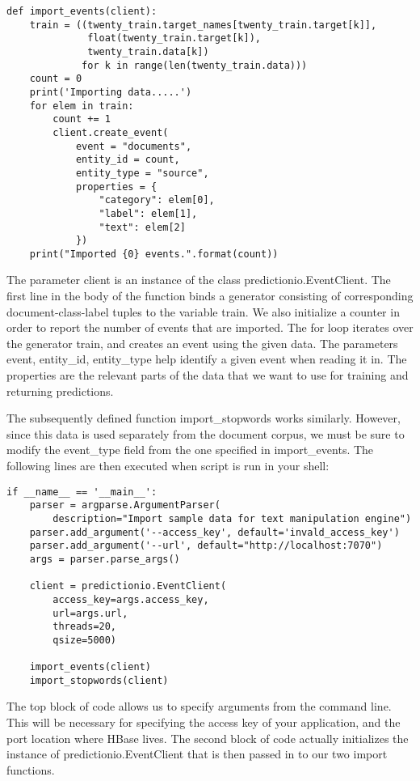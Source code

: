 \documentclass[a4paper,12pt]{article}
\newcommand{\3}{\left}
\newcommand{\4}{\right}
\renewcommand{\-}[1]{{}^{-#1}}
\begin{document}
\begin{verbatim}
def import_events(client):
    train = ((twenty_train.target_names[twenty_train.target[k]],
              float(twenty_train.target[k]),
              twenty_train.data[k]) 
             for k in range(len(twenty_train.data)))
    count = 0
    print('Importing data.....')
    for elem in train:
        count += 1
        client.create_event(
            event = "documents",
            entity_id = count,
            entity_type = "source",
            properties = {
                "category": elem[0],
                "label": elem[1],
                "text": elem[2]
            })
    print("Imported {0} events.".format(count))
\end{verbatim}

The parameter client is an instance of the class predictionio.EventClient. The first line in the body of the function binds a generator consisting of corresponding document-class-label tuples to the variable train. We also initialize a counter in order to report the number of events that are imported. The for loop iterates over the generator train, and creates an event using the given data. The parameters event, entity\_id, entity\_type help identify a given event when reading it in. The properties are the relevant parts of the data that we want to use for training and returning predictions.

The subsequently defined function import\_stopwords works similarly. However, since this data is used separately from the document corpus, we must be sure to modify the event\_type field from the one specified in import\_events. The following lines are then executed when script is run in your shell:

\begin{verbatim}
if __name__ == '__main__':
    parser = argparse.ArgumentParser(
        description="Import sample data for text manipulation engine")
    parser.add_argument('--access_key', default='invald_access_key')
    parser.add_argument('--url', default="http://localhost:7070")
    args = parser.parse_args()

    client = predictionio.EventClient(
        access_key=args.access_key,
        url=args.url,
        threads=20,
        qsize=5000)

    import_events(client)
    import_stopwords(client)
\end{verbatim}

The top block of code allows us to specify arguments from the command line. This will be necessary for specifying the access key of your application, and the port location where HBase lives. The second block of code actually initializes the instance of predictionio.EventClient that is then passed in to our two import functions. 
\end{document}
